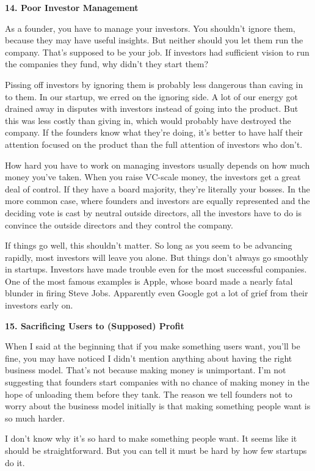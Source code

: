 \textbf{14. Poor Investor Management}

As a founder, you have to manage your investors. You shouldn't ignore
them, because they may have useful insights. But neither should you let
them run the company. That's supposed to be your job. If investors had
sufficient vision to run the companies they fund, why didn't they start
them?

Pissing off investors by ignoring them is probably less dangerous than
caving in to them. In our startup, we erred on the ignoring side. A lot
of our energy got drained away in disputes with investors instead of
going into the product. But this was less costly than giving in, which
would probably have destroyed the company. If the founders know what
they're doing, it's better to have half their attention focused on the
product than the full attention of investors who don't.

How hard you have to work on managing investors usually depends on how
much money you've taken. When you raise VC-scale money, the investors
get a great deal of control. If they have a board majority, they're
literally your bosses. In the more common case, where founders and
investors are equally represented and the deciding vote is cast by
neutral outside directors, all the investors have to do is convince the
outside directors and they control the company.

If things go well, this shouldn't matter. So long as you seem to be
advancing rapidly, most investors will leave you alone. But things don't
always go smoothly in startups. Investors have made trouble even for the
most successful companies. One of the most famous examples is Apple,
whose board made a nearly fatal blunder in firing Steve Jobs. Apparently
even Google got a lot of grief from their investors early on.

\textbf{15. Sacrificing Users to (Supposed) Profit}

When I said at the beginning that if you make something users want,
you'll be fine, you may have noticed I didn't mention anything about
having the right business model. That's not because making money is
unimportant. I'm not suggesting that founders start companies with no
chance of making money in the hope of unloading them before they tank.
The reason we tell founders not to worry about the business model
initially is that making something people want is so much harder.

I don't know why it's so hard to make something people want. It seems
like it should be straightforward. But you can tell it must be hard by
how few startups do it.

